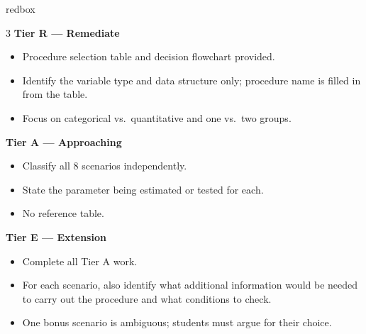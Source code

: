 \documentclass[10pt]{article}
\begin{document}
\begin{skillbox}{redbox}
\begin{multicols}{3}
    \textbf{Tier R --- Remediate}
    \begin{itemize}
        \item Procedure selection table and decision flowchart provided.
        \item Identify the variable type and data structure only; procedure name
              is filled in from the table.
        \item Focus on categorical vs.\ quantitative and one vs.\ two groups.
    \end{itemize}
    \columnbreak
    \textbf{Tier A --- Approaching}
    \begin{itemize}
        \item Classify all 8 scenarios independently.
        \item State the parameter being estimated or tested for each.
        \item No reference table.
    \end{itemize}
    \columnbreak
    \textbf{Tier E --- Extension}
    \begin{itemize}
        \item Complete all Tier A work.
        \item For each scenario, also identify what additional information would be
              needed to carry out the procedure and what conditions to check.
        \item One bonus scenario is ambiguous; students must argue for their choice.
    \end{itemize}
\end{multicols}
\end{skillbox}
\end{document}
